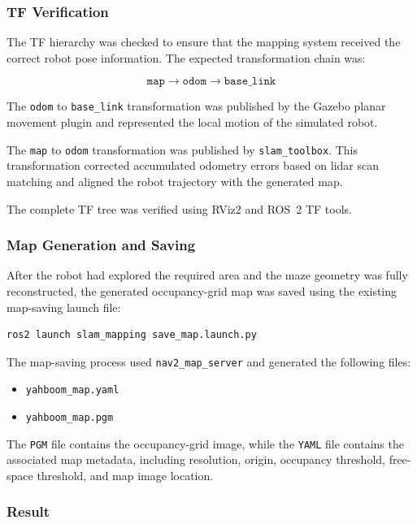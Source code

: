 \documentclass{article}
\begin{document}
\subsubsection{TF Verification}

The TF hierarchy was checked to ensure that the mapping system received the correct robot pose information. The expected transformation chain was:

\[
\texttt{map}
\rightarrow
\texttt{odom}
\rightarrow
\texttt{base\_link}
\]

The \texttt{odom} to \texttt{base\_link} transformation was published by the Gazebo planar movement plugin and represented the local motion of the simulated robot.

The \texttt{map} to \texttt{odom} transformation was published by \texttt{slam\_toolbox}. This transformation corrected accumulated odometry errors based on lidar scan matching and aligned the robot trajectory with the generated map.

The complete TF tree was verified using RViz2 and ROS~2 TF tools.

\subsubsection{Map Generation and Saving}

After the robot had explored the required area and the maze geometry was fully reconstructed, the generated occupancy-grid map was saved using the existing map-saving launch file:

\begin{verbatim}
ros2 launch slam_mapping save_map.launch.py
\end{verbatim}

The map-saving process used \texttt{nav2\_map\_server} and generated the following files:

\begin{itemize}
    \item \texttt{yahboom\_map.yaml}
    \item \texttt{yahboom\_map.pgm}
\end{itemize}

The \texttt{PGM} file contains the occupancy-grid image, while the \texttt{YAML} file contains the associated map metadata, including resolution, origin, occupancy threshold, free-space threshold, and map image location.

\subsubsection{Result}
\end{document}
